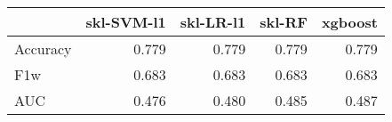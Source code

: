 \begin{tabular}{lrrrr}
\toprule
{} &  skl-SVM-l1 &  skl-LR-l1 &  skl-RF &  xgboost \\
\midrule
Accuracy &       0.779 &      0.779 &   0.779 &    0.779 \\
F1w      &       0.683 &      0.683 &   0.683 &    0.683 \\
AUC      &       0.476 &      0.480 &   0.485 &    0.487 \\
\bottomrule
\end{tabular}
